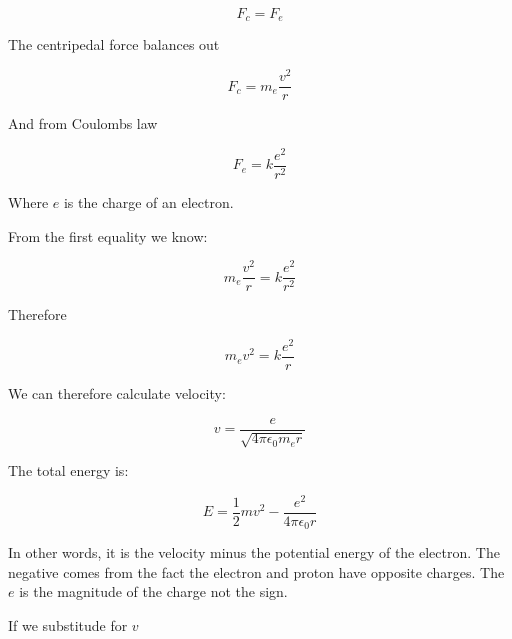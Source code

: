 \documentclass{report}
\begin{document}
\begin{description}
\begin{mdframed}
            \begin{displaymath}
                F_c = F_e
            \end{displaymath}

            The centripedal force balances out

            \begin{displaymath}
                F_c = m_e \frac{v^2}{r}
            \end{displaymath}

            And from Coulombs law

            \begin{displaymath}
                F_e = k \frac{e^2}{r^2}
            \end{displaymath}

            Where $e$ is the charge of an electron.
            
            From the first equality we know:

            \begin{displaymath}
                m_e \frac{v^2}{r} = k \frac{e^2}{r^2}
            \end{displaymath}
            
            Therefore

            \begin{displaymath}
                m_e v^2 = k \frac{e^2}{r}
            \end{displaymath}
            
            We can therefore calculate velocity:

            \begin{displaymath}
                v = \frac{e}{\sqrt{4 \pi \epsilon_0 m_e r}}
            \end{displaymath}
            
            The total energy is:

            \begin{displaymath}
                E = \frac{1}{2} mv^2 - \frac{e^2}{4\pi \epsilon_0 r}
            \end{displaymath}
            
            In other words, it is the velocity minus the potential
            energy of the electron. The negative comes from the fact
            the electron and proton have opposite charges. The
            $e$ is the magnitude of the charge not the sign.
        \end{mdframed}
        \begin{mdframed}
            If we substitude for $v$


\end{mdframed}
\end{description}
\end{document}

